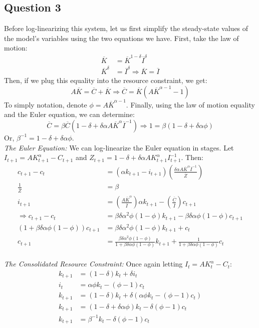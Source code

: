 \documentclass{article}
\begin{document}
\subsection*{Question 3}
Before log-linearizing this system, let us first simplify the steady-state values of the model's variables using the two equations we have. First, take the law of motion:
\begin{align*}
	\overline{K}		&= \overline{K}^{1-\delta}\overline{I}^\delta 	\\
	\overline{K}^\delta &= \overline{I}^\delta	\Rightarrow \overline{K} = \overline{I}
\end{align*}
Then, if we plug this equality into the resource constraint, we get:
\[
	A\overline{K} = \overline{C} + \overline{K} \Rightarrow \overline{C} = \overline{K}\left(A\overline{K}^{\alpha-1} - 1\right)
\]
To simply notation, denote ${\phi = A\overline{K}^{\alpha-1}}$. Finally, using the law of motion equality and the Euler equation, we can determine:
\[
	\overline{C} = \beta\overline{C}(1-\delta+\delta\alpha A\overline{K}^\alpha\overline{I}^{-1}) \Rightarrow 1 = \beta(1-\delta+\delta\alpha\phi)
\]
Or, ${\beta^{-1} = 1-\delta+\delta\alpha\phi}$.
\medskip \\
\textit{The Euler Equation:} We can log-linearize the Euler equation in stages. Let ${I_{t+1} = AK_{t+1}^\alpha - C_{t+1}}$ and ${Z_{t+1} = 1-\delta+\delta\alpha AK^\alpha_{t+1}I_{t+1}^{-1}}$. Then:
	\begin{align*}
		c_{t+1} - c_t &= \left(\alpha k_{t+1} - i_{t+1}\right)\left(\frac{\delta\alpha A\overline{K}^\alpha\overline{I}^{-1}}{\overline{Z}}\right)	\\
		\frac{1}{\overline{Z}} &= \beta																												\\
		i_{t+1}	&= \left(\frac{A\overline{K}^\alpha}{\overline{I}}\right)\alpha k_{t+1} - \left(\frac{\overline{C}}{\overline{I}}\right)c_{t+1}			\\
	\Rightarrow 	
		c_{t+1} - c_t &= \beta\delta\alpha^2\phi(1-\phi)k_{t+1} - \beta\delta\alpha\phi(1-\phi)c_{t+1}	\\
		\left(1 + \beta\delta\alpha\phi(1-\phi)\right)c_{t+1} &= \beta\delta\alpha^2\phi(1-\phi)k_{t+1} + c_t	\\
		c_{t+1} &= \frac{\beta\delta\alpha^2\phi(1-\phi)}{1 + \beta\delta\alpha\phi(1-\phi)}k_{t+1} + \frac{1}{1 + \beta\delta\alpha\phi(1-\phi)}c_t
	\end{align*}
\\
\textit{The Consolidated Resource Constraint:} Once again letting ${I_t = AK_t^\alpha - C_t}$:
	\begin{align*}
		k_{t+1} &= (1-\delta)k_t + \delta i_t										\\
		i_t 	&= \alpha\phi k_t - (\phi-1)c_t										\\
		k_{t+1} &= (1-\delta)k_t + \delta\left(\alpha\phi k_t - (\phi-1)c_t\right)	\\
		k_{t+1} &= (1-\delta + \delta\alpha\phi)k_t - \delta(\phi-1)c_t				\\
		k_{t+1} &= \beta^{-1}k_t - \delta(\phi-1)c_t				
	\end{align*}
\end{document}
